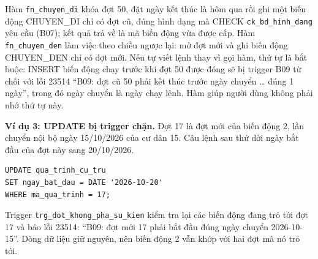 Hàm \texttt{fn\_chuyen\_di} khóa đợt 50, đặt ngày kết thúc là hôm qua rồi ghi một biến động CHUYEN\_DI chỉ có đợt cũ, đúng hình dạng mà CHECK \texttt{ck\_bd\_hinh\_dang} yêu cầu (B07); kết quả trả về là mã biến động vừa được cấp. Hàm \texttt{fn\_chuyen\_den} làm việc theo chiều ngược lại: mở đợt mới và ghi biến động CHUYEN\_DEN chỉ có đợt mới. Nếu tự viết lệnh thay vì gọi hàm, thứ tự là bắt buộc: INSERT biến động chạy trước khi đợt 50 được đóng sẽ bị trigger B09 từ chối với lỗi 23514 ``B09: đợt cũ 50 phải kết thúc trước ngày chuyển \ldots{} đúng 1 ngày'', trong đó ngày chuyển là ngày chạy lệnh. Hàm giúp người dùng không phải nhớ thứ tự này.

\textbf{Ví dụ 3: UPDATE bị trigger chặn.} Đợt 17 là đợt mới của biến động 2, lần chuyển nội bộ ngày 15/10/2026 của cư dân 15. Câu lệnh sau thử dời ngày bắt đầu của đợt này sang 20/10/2026.

\begin{lstlisting}[style=sqlvn]
UPDATE qua_trinh_cu_tru
SET ngay_bat_dau = DATE '2026-10-20'
WHERE ma_qua_trinh = 17;
\end{lstlisting}

Trigger \texttt{trg\_dot\_khong\_pha\_su\_kien} kiểm tra lại các biến động đang trỏ tới đợt 17 và báo lỗi 23514: ``B09: đợt mới 17 phải bắt đầu đúng ngày chuyển 2026-10-15''. Dòng dữ liệu giữ nguyên, nên biến động 2 vẫn khớp với hai đợt mà nó trỏ tới.
